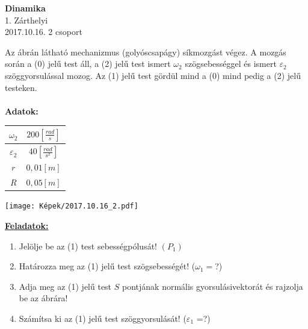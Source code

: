 \documentclass[11pt,a4paper]{article}
\begin{document}
\begin{center}
    \textbf{\LARGE{Dinamika}}\\
    1. Zárthelyi\\
    2017.10.16. 2 csoport
\end{center}
Az ábrán látható mechanizmus (golyóscsapágy) síkmozgást végez. A mozgás során a (0) jelű test áll, a (2) jelű test ismert $\omega_2$ szögsebességgel és ismert $\varepsilon_2$ szöggyorsulással mozog. Az (1) jelű test gördül mind a (0) mind pedig a (2) jelű testeken.\\\\
\textbf{Adatok:}\\
\begin{tabular}{| c | c |}
    \hline
    $\omega_2 $&$ 200 \left[\frac{rad}{s}\right]$\\
    \hline
    $\varepsilon_2 $&$ 40 \left[\frac{rad}{s^2}\right]$\\
    \hline
    $r $&$ 0,01 [m]$\\
    \hline
    $R $&$ 0,05 [m]$\\
    \hline
\end{tabular}
\begin{center}
    \texttt{[image: Képek/2017.10.16\_2.pdf]}
\end{center}

\underline{\textbf{Feladatok:}}
\begin{enumerate}
    \item Jelölje be az (1) test sebességpólusát! $(P_1)$
    \item Határozza meg az (1) jelű test szögsebességét! ($\omega_1 = $?)
    \item Adja meg az (1) jelű test $S$ pontjának normális gyorsulásivektorát és rajzolja be az ábrára!
    \item Számítsa ki az (1) jelű test szöggyorsulását! ($\varepsilon_1$ =?)
\end{enumerate}
\newpage
\end{document}

